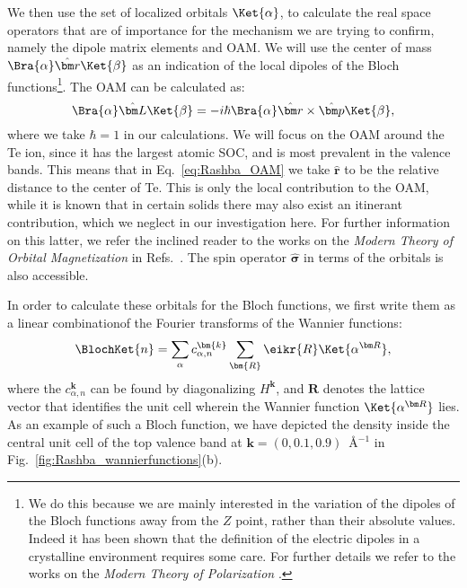 \\\\
We then use the set of localized orbitals $\Ket{\alpha}$, to calculate the real space operators that are of importance for the mechanism we are trying to confirm, namely the dipole matrix elements and OAM.
We will use the center of mass $\Bra{\alpha} \hat{\bm r} \Ket{\beta}$ as an indication of the local dipoles of the Bloch functions\footnote{We do this because we are mainly interested in the variation of the dipoles of the Bloch functions away from the $Z$ point, rather than their absolute values. Indeed it has been shown that the definition of the electric dipoles in a crystalline environment requires some care. For further details we refer to the works on the {\it Modern Theory of Polarization} \cite{King-Smith1993,Vanderbilt1993,Resta1998, Spaldin2012,Vanderbilt18}.}.
The OAM can be calculated as:
\begin{equation}
	\label{eq:Rashba_OAM}
	\Bra{\alpha}\hat{\bm L}\Ket{\beta} = -i\hbar \Bra{\alpha} \hat{\bm r} \times \hat{\bm p} \Ket{\beta},
\end{equation}
where we take $\hbar = 1$ in our calculations.
We will focus on the OAM around the Te ion, since it has the largest atomic SOC, and is most prevalent in the valence bands. This means that in Eq.~\eqref{eq:Rashba_OAM} we take $\hat{\bm r}$ to be the relative distance to the center of Te.
This is only the local contribution to the OAM, while it is known that in certain solids there may also exist an itinerant contribution, which we neglect in our investigation here. For further information on this latter, we refer the inclined reader to the works on the {\it Modern Theory of Orbital Magnetization} in Refs.~\cite{Thonhauser2005OrbitalInsulators,Ceresoli2006OrbitalMetals,Thonhauser2011,Vanderbilt18}.
The spin operator $\hat{\bm \sigma}$ in terms of the orbitals is also accessible.

In order to calculate these orbitals for the Bloch functions, we first write them as a linear combinationof the Fourier transforms of the Wannier functions:
\begin{equation}
	\label{eq:Rashba_blochfromwan}
	\BlochKet{n} = \sum_{\alpha} c_{\alpha, n}^{\bm{k}}\sum_{\bm{R}} \eikr{R}\Ket{\alpha^{\bm R}},
\end{equation}
where the $c_{\alpha,n}^{\bm{k}}$ can be found by diagonalizing $H^{\bm k}$, and $\bm R$ denotes the lattice vector that identifies the unit cell wherein the Wannier function $\Ket{\alpha^{\bm R}}$ lies.
As an example of such a Bloch function, we have depicted the density inside the central unit cell of the top valence band at $\bm k = (0, 0.1, 0.9)$~\AA$^{-1}$ in Fig.~\ref{fig:Rashba_wannierfunctions}(b).


